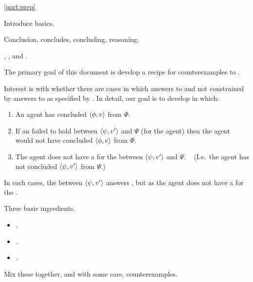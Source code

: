 \begin{note}

  \autoref{part:prep}

    Introduce basics.
  \begin{TOCEnum}
  \item

    Conclusion, concludes, concluding, reasoning.
  \item

    \qWhyV{}, \qHowV{}, and \issueConstraint{}.
  \end{TOCEnum}

  The primary goal of this document is develop a recipe for counterexamples to \issueConstraint{}.

  Interest is with whether there are cases in which answers to \qWhyV{} and not constrained by answers to \qHowV{} as specified by \issueConstraint{}.
  In detail, our goal is to develop  in which:

  \begin{enumerate}
  \item
    An agent has concluded \(\langle \phi, v \rangle\) from \(\Phi\).
  \item
    If an \ros{} failed to hold between \(\langle \psi, v' \rangle\) and \(\Psi\) (for the agent) then the agent would not have concluded \(\langle \phi, v \rangle\) from \(\Phi\).
  \item
    The agent does not have a \wit{} for the \ros{} between \(\langle \psi, v' \rangle\) and \(\Psi\).%
    \mbox{ }\hfill%
    (I.e.\ the agent has not concluded \(\langle \psi, v' \rangle\) from \(\Psi\).)
  \end{enumerate}

  In such cases, the \ros{} between \(\langle \psi, v' \rangle\) answers \qWhyV{}, but as the agent does not have a \wit{} for the \ros{}.
\end{note}

\begin{note}
  Three basic ingredients.

  \begin{itemize}
  \item
    .
  \item
    .
  \item
    .
  \end{itemize}

  Mix these together, and with some care, counterexamples.
\end{note}


